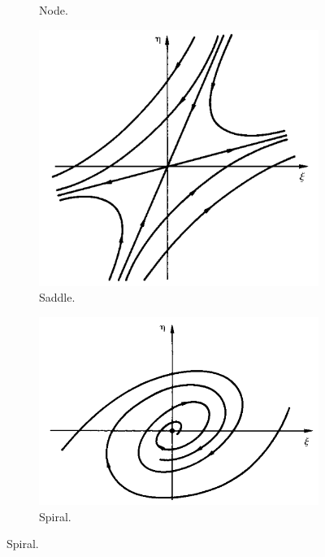 \documentclass[../notes.tex]{subfiles}
\begin{document}
\begin{itemize}
\begin{figure}[h!]
\begin{subfigure}[b]{0.24\linewidth}
            \caption{Node.}
            \label{fig:classifyFixedPointa}
        \end{subfigure}
        \begin{subfigure}[b]{0.24\linewidth}
            \centering
            \includegraphics[width=0.95\linewidth]{../ExtFiles/classifyFixedPointsb.png}
            \caption{Saddle.}
            \label{fig:classifyFixedPointb}
        \end{subfigure}
        \begin{subfigure}[b]{0.24\linewidth}
            \centering
            \includegraphics[width=0.95\linewidth]{../ExtFiles/classifyFixedPointsc.png}
            \caption{Spiral.}
            \label{fig:classifyFixedPointc}

\end{subfigure}
\end{figure}
\end{itemize}
\end{document}
